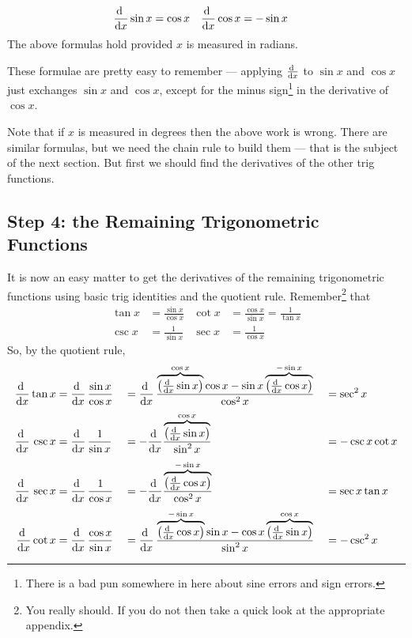 \begin{lemma}\label{lem DIFFsincos}
\begin{align*}
\diff{}{x}\sin x &=\cos x &
\diff{}{x}\cos x &=-\sin x
\end{align*}
The above formulas hold provided $x$ is measured in radians.
\end{lemma}
These formulae are pretty easy to remember --- applying $\diff{}{x}$
to $\sin x$ and $\cos x$ just exchanges $\sin x$ and $\cos x$, except for
the minus sign\footnote{There is a bad pun somewhere in here about sine errors and sign
errors.} in the derivative of $\cos x$.

Note that if $x$ is measured in degrees then the above work is wrong. There
are similar formulas, but we need the chain rule to build them --- that is the
subject of the next section. But first we should find the
derivatives of the other trig functions.

\goodbreak
\subsection*{Step 4: the Remaining Trigonometric Functions}

It is now an easy matter to get the derivatives of the remaining
trigonometric functions using basic trig identities and the
quotient rule. Remember\footnote{You really should. If you do not then take a
quick look at the appropriate appendix.} that
\begin{align*}
  \tan x&=  \frac{\sin x}{\cos x} & \cot x &= \frac{\cos x}{\sin x}=
\frac{1}{\tan x} \\
  \csc x&=  \frac{1}{\sin x} & \sec x &= \frac{1}{\cos x}
\end{align*}
So, by the quotient rule,
\begin{alignat*}{7}
\diff{}{x}\tan x
&=\diff{}{x}\,\frac{\sin x}{\cos x} &
&=\diff{}{x}\,\frac{
         \overbrace{\big({\ts\diff{}{x}}\sin x\big)}^{\cos x}\cos x
       -\sin x\overbrace{\big({\ts\diff{}{x}\cos x}\big)}^{-\sin x}}
                         {\cos^2 x} &
&=\sec^2 x \\[0.05in]
\diff{}{x}\,\csc x
&=\diff{}{x}\,\frac{1}{\sin x} &
&=-\diff{}{x}\frac{
         \overbrace{\big({\ts\diff{}{x}}\sin x\big)}^{\cos x}}
                         {\sin^2 x} &
&=-\csc x\cot x \\[0.05in]
\diff{}{x}\,\sec x
&=\diff{}{x}\,\frac{1}{\cos x} &
&=-\diff{}{x}\frac{
         \overbrace{\big({\ts\diff{}{x}}\cos x\big)}^{-\sin x}}
                         {\cos^2 x} &
&=\sec x\tan x \\[0.05in]
\diff{}{x}\cot x
&=\diff{}{x}\,\frac{\cos x}{\sin x} &
&=\diff{}{x}\,\frac{
         \overbrace{\big({\ts\diff{}{x}}\cos x\big)}^{-\sin x}\sin x
       -\cos x\overbrace{{\ts\big(\diff{}{x}}\sin x\big)}^{\cos x}}
                         {\sin^2 x} &
&=-\csc^2 x
\end{alignat*}

